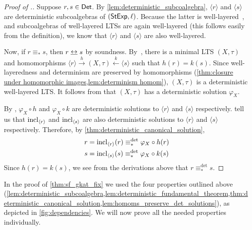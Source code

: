 \documentclass[orivec,envcountsect,envcountsame]{llncs}
\begin{document}
\begin{proof}[Proof of .]
	Suppose \(r,s \in \mathsf{Det}\).
	By \cref{lem:deterministic_subcoalgebra}, \(\langle r \rangle\) and \(\langle s\rangle\) are deterministic subcoalgebras of \((\mathsf{StExp}, \ell)\).
    Because the latter is well-layered~\cite{starmfps}, and subcoalgebras of well-layered LTSs are again well-layered (this follows easily from the definition), we know that \(\langle r \rangle\) and \(\langle s \rangle\) are also well-layered.

	Now, if \(r \equiv_* s\), then \(r \bisim s\) by soundness.
	By~\cite[Theorem 4.2]{coalgebra}, there is a minimal LTS \((X,\tau)\) and homomorphisms \(\langle r\rangle \xrightarrow{h} (X,\tau) \xleftarrow{k} \langle s\rangle\) such that \(h(r) = k(s)\).
	Since well-layeredness and determinism are preserved by homomorphisms (\cref{thm:closure under homomorphic images,lem:determinism homom}), \((X,\tau)\) is a deterministic well-layered LTS\@.
	It follows from  that \((X,\tau)\) has a deterministic solution \(\varphi_X\).

	By , \(\varphi_X\circ h\) and \(\varphi_X\circ k\) are deterministic solutions to \(\langle r\rangle\) and \(\langle s\rangle\) respectively.
	 tell us that \(\operatorname{incl}_{\langle r\rangle}\) and \(\operatorname{incl}_{\langle s\rangle}\) are also deterministic solutions to \(\langle r\rangle\) and \(\langle s\rangle\) respectively.
	Therefore, by \cref{thm:deterministic_canonical_solution},
	\begin{align*}
		r &= \operatorname{incl}_{\langle r\rangle} (r) \equiv_*^{\det} \varphi_X\circ h(r) \\
		s &= \operatorname{incl}_{\langle s\rangle} (s) \equiv_*^{\det} \varphi_X\circ k(s)
	\end{align*}
	Since \(h(r) = k(s)\), we see from the derivations above that \(r \equiv_*^{\det} s\).
\end{proof}

In the proof of \cref{thm:sf_gkat_fix} we used the four properties outlined above (\cref{lem:deterministic_subcoalgebra,lem:deterministic_fundamental_theorem,thm:deterministic_canonical_solution,lem:homoms_preserve_det_solutions}), as depicted in \cref{fig:dependencies}. We will now prove all the needed properties individually.
\end{document}

